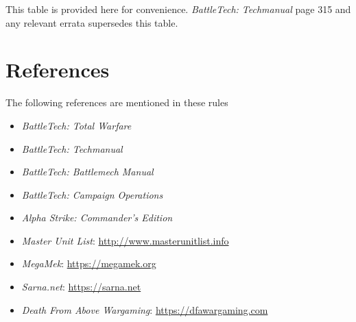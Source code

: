 \documentclass{article}
\begin{document}
This table is provided here for convenience.
\emph{BattleTech: Techmanual} page 315 and any relevant errata supersedes this table.

\newpage

\section{References}

The following references are mentioned in these rules

\begin{itemize}

\item \emph{BattleTech: Total Warfare}

\item \emph{BattleTech: Techmanual}

\item \emph{BattleTech: Battlemech Manual}

\item \emph{BattleTech: Campaign Operations}

\item \emph{Alpha Strike: Commander's Edition}

\item \emph{Master Unit List}: \href{http://www.masterunitlist.info}{http://www.masterunitlist.info}

\item \emph{MegaMek}: \href{https://megamek.org}{https://megamek.org}

\item \emph{Sarna.net}: \href{https://sarna.net}{https://sarna.net}

\item \emph{Death From Above Wargaming}: \href{https://dfawargaming.com}{https://dfawargaming.com}

\end{itemize}
\end{document}
